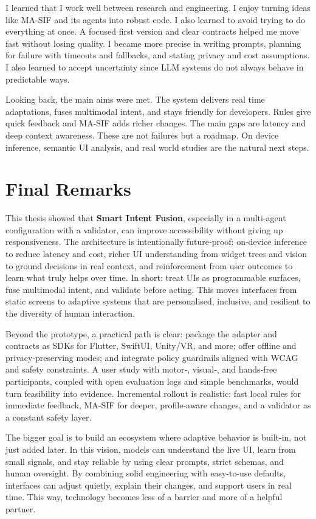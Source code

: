 \documentclass[openany]{book}
\begin{document}
I learned that I work well between research and engineering. I enjoy turning ideas like MA-SIF and its agents into robust code. I also learned to avoid trying to do everything at once. A focused first version and clear contracts helped me move fast without losing quality. I became more precise in writing prompts, planning for failure with timeouts and fallbacks, and stating privacy and cost assumptions. I also learned to accept uncertainty since LLM systems do not always behave in predictable ways.

Looking back, the main aims were met. The system delivers real time adaptations, fuses multimodal intent, and stays friendly for developers. Rules give quick feedback and MA-SIF adds richer changes. The main gaps are latency and deep context awareness. These are not failures but a roadmap. On device inference, semantic UI analysis, and real world studies are the natural next steps.

\section{Final Remarks}
This thesis showed that \textbf{Smart Intent Fusion}, especially in a multi‑agent configuration with a validator, can improve accessibility without giving up responsiveness. The architecture is intentionally future‑proof: on‑device inference to reduce latency and cost, richer UI understanding from widget trees and vision to ground decisions in real context, and reinforcement from user outcomes to learn what truly helps over time. In short: treat UIs as programmable surfaces, fuse multimodal intent, and validate before acting. This moves interfaces from static screens to adaptive systems that are personalised, inclusive, and resilient to the diversity of human interaction.

Beyond the prototype, a practical path is clear: package the adapter and contracts as SDKs for Flutter, SwiftUI, Unity/VR, and more; offer offline and privacy‑preserving modes; and integrate policy guardrails aligned with WCAG and safety constraints. A user study with motor‑, visual‑, and hands‑free participants, coupled with open evaluation logs and simple benchmarks, would turn feasibility into evidence. Incremental rollout is realistic: fast local rules for immediate feedback, MA‑SIF for deeper, profile‑aware changes, and a validator as a constant safety layer.

The bigger goal is to build an ecosystem where adaptive behavior is built-in, not just added later. In this vision, models can understand the live UI, learn from small signals, and stay reliable by using clear prompts, strict schemas, and human oversight. By combining solid engineering with easy-to-use defaults, interfaces can adjust quietly, explain their changes, and support users in real time. This way, technology becomes less of a barrier and more of a helpful partner.

\printbibliography[title=References]
\end{document}
